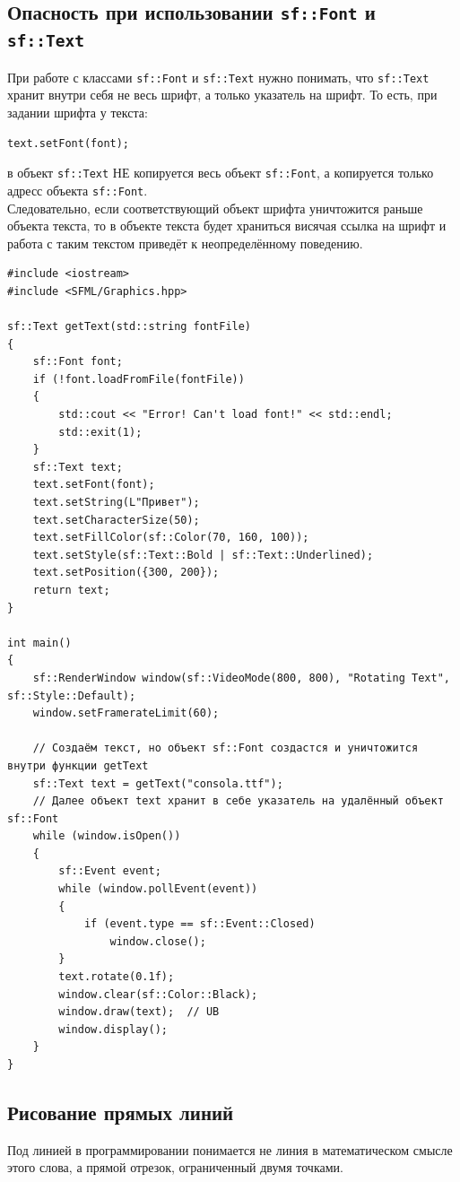 \documentclass{article}
\begin{document}
\newpage
\subsection*{Опасность при использовании \texttt{sf::Font} и \texttt{sf::Text}}
При работе с классами \texttt{sf::Font} и \texttt{sf::Text} нужно понимать, что \texttt{sf::Text} хранит внутри себя не весь шрифт, а только указатель на шрифт. То есть, при задании шрифта у текста:
\begin{lstlisting}[frame=none]
text.setFont(font);
\end{lstlisting}
в объект \texttt{sf::Text} НЕ копируется весь объект \texttt{sf::Font}, а копируется только адресс объекта \texttt{sf::Font}.\\
Следовательно, если соответствующий объект шрифта уничтожится раньше объекта текста, то в объекте текста будет храниться висячая ссылка на шрифт и работа с таким текстом приведёт к неопределённому поведению.

\begin{lstlisting}
#include <iostream>
#include <SFML/Graphics.hpp>

sf::Text getText(std::string fontFile)
{
    sf::Font font;
    if (!font.loadFromFile(fontFile))
    {
        std::cout << "Error! Can't load font!" << std::endl;
        std::exit(1);
    }
    sf::Text text;
    text.setFont(font);
    text.setString(L"Привет");
    text.setCharacterSize(50);
    text.setFillColor(sf::Color(70, 160, 100));
    text.setStyle(sf::Text::Bold | sf::Text::Underlined);
    text.setPosition({300, 200});
    return text;
}

int main()
{
    sf::RenderWindow window(sf::VideoMode(800, 800), "Rotating Text", sf::Style::Default);
    window.setFramerateLimit(60);
    
    // Создаём текст, но объект sf::Font создастся и уничтожится внутри функции getText
    sf::Text text = getText("consola.ttf");
    // Далее объект text хранит в себе указатель на удалённый объект sf::Font
    while (window.isOpen())
    {
        sf::Event event;
        while (window.pollEvent(event)) 
        {
            if (event.type == sf::Event::Closed)
                window.close();
        }
        text.rotate(0.1f);
        window.clear(sf::Color::Black);
        window.draw(text);  // UB
        window.display();
    }
}
\end{lstlisting}

\newpage
\subsection*{Рисование прямых линий}
Под линией в программировании понимается не линия в математическом смысле этого слова, а прямой отрезок, ограниченный двумя точками.
\end{document}
